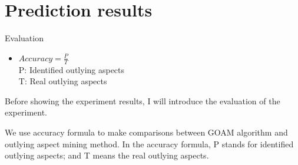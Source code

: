 \documentclass[
size=14pt,
paper=smartboard,  %
mode=present, 		%
display=slides, 	%
style=tuliplab,  	%
pauseslide,
fleqn,leqno]{powerdot}
\begin{document}
\section{Prediction results}
\begin{slide}[toc=,bm=]{Evaluation}
	
	\begin{center}
		\begin{itemize}
			
			\item
			\smallskip
			\large
			{$Accuracy = \frac{P}{T}$ \\
				P: Identified outlying aspects \\
				
				T: Real outlying aspects}
			
		\end{itemize}
	\end{center}
	
	\begin{note}
		Before showing the experiment results,
		I will introduce the evaluation of the experiment.
		
		We use accuracy formula to make comparisons between GOAM algorithm
		and outlying aspect mining method.
		In the accuracy formula,
		P stands for identified outlying aspects;
		and T means the real outlying aspects.
	\end{note}
	
\end{slide}
\end{document}
